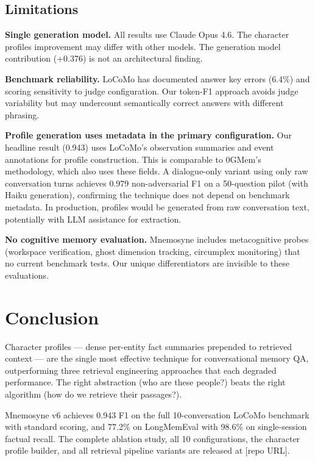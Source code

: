 \documentclass[11pt]{article}
\begin{document}
\subsection{Limitations}

\textbf{Single generation model.} All results use Claude Opus 4.6. The character profiles improvement may differ with other models. The generation model contribution (+0.376) is not an architectural finding.

\textbf{Benchmark reliability.} LoCoMo has documented answer key errors (6.4\%) and scoring sensitivity to judge configuration. Our token-F1 approach avoids judge variability but may undercount semantically correct answers with different phrasing.

\textbf{Profile generation uses metadata in the primary configuration.} Our headline result (0.943) uses LoCoMo's observation summaries and event annotations for profile construction. This is comparable to 0GMem's methodology, which also uses these fields. A dialogue-only variant using only raw conversation turns achieves 0.979 non-adversarial F1 on a 50-question pilot (with Haiku generation), confirming the technique does not depend on benchmark metadata. In production, profiles would be generated from raw conversation text, potentially with LLM assistance for extraction.

\textbf{No cognitive memory evaluation.} Mnemosyne includes metacognitive probes (workspace verification, ghost dimension tracking, circumplex monitoring) that no current benchmark tests. Our unique differentiators are invisible to these evaluations.



\section{Conclusion}

Character profiles --- dense per-entity fact summaries prepended to retrieved context --- are the single most effective technique for conversational memory QA, outperforming three retrieval engineering approaches that each degraded performance. The right abstraction (who are these people?) beats the right algorithm (how do we retrieve their passages?).

Mnemosyne v6 achieves 0.943 F1 on the full 10-conversation LoCoMo benchmark with standard scoring, and 77.2\% on LongMemEval with 98.6\% on single-session factual recall. The complete ablation study, all 10 configurations, the character profile builder, and all retrieval pipeline variants are released at [repo URL].
\end{document}
